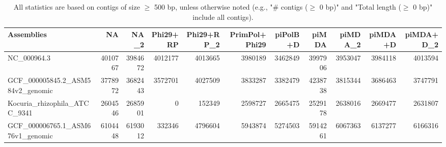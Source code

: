 \documentclass[12pt,a4paper]{article}
\begin{document}
\begin{table}[ht]
\begin{center}
\caption{All statistics are based on contigs of size $\geq$ 500 bp, unless otherwise noted (e.g., "\# contigs ($\geq$ 0 bp)" and "Total length ($\geq$ 0 bp)" include all contigs).}
\begin{tabular}{|l*{10}{|r}|}
\hline
Assemblies & NA & NA\_2 & Phi29+RP & Phi29+RP\_2 & PrimPol+Phi29 & piPolB+D & piMDA & piMDA\_2 & piMDA+D & piMDA+D\_2 \\ \hline
NC\_000964.3 & 4010767 & 3984672 & 4012177 & 4013665 & 3980189 & 3462849 & 3997906 & 3953047 & 3984118 & 4013594 \\ \hline
GCF\_000005845.2\_ASM584v2\_genomic & 3778972 & 3682443 & 3572701 & 4027509 & 3833287 & 3382479 & 4238738 & 3815344 & 3686463 & 3747791 \\ \hline
Kocuria\_rhizophila\_ATCC\_9341 & 2604546 & 2685901 & 0 & 152349 & 2598727 & 2665475 & 2529178 & 2638016 & 2669477 & 2631807 \\ \hline
GCF\_000006765.1\_ASM676v1\_genomic & 6104448 & 6193012 & 332346 & 4796604 & 5943874 & 5274503 & 5914261 & 6067363 & 6137277 & 6166316 \\ \hline
\end{tabular}
\end{center}
\end{table}
\end{document}
